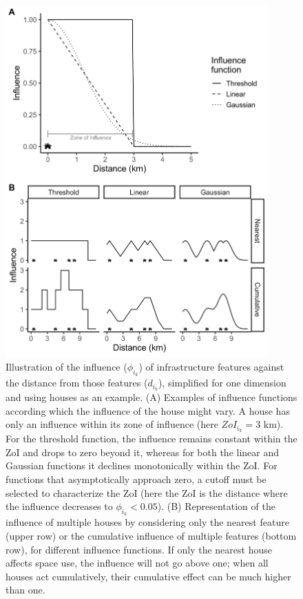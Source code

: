\documentclass[titlepage]{article}
\begin{document}
\begin{figure}[h]
\centering
\includegraphics[width=0.9\textwidth]{figures/ZoI_conceptual.png}
\caption{\label{fig:zoi_conceptual} Illustration of the influence ($\phi_{i_k}$) of infrastructure features against the distance from those features ($d_{i_k}$), simplified for one dimension and using houses as an example. (A) Examples of influence functions according which the influence of the house might vary. A house has only an influence within its zone of influence (here $ZoI_{i_k} = 3 \text{ km}$). For the threshold function, the influence remains constant within the ZoI and drops to zero beyond it, whereas for both the linear and Gaussian functions it declines monotonically within the ZoI. For functions that asymptotically approach zero, a cutoff must be selected to characterize the ZoI (here the ZoI is the distance where the influence decreases to $\phi_{i_k} < 0.05$). (B) Representation of the influence of multiple houses by considering only the nearest feature (upper row) or the cumulative influence of multiple features (bottom row), for different influence functions. If only the nearest house affects space use, the influence will not go above one; when all houses act cumulatively, their cumulative effect can be much higher than one.}
\end{figure}
\end{document}
